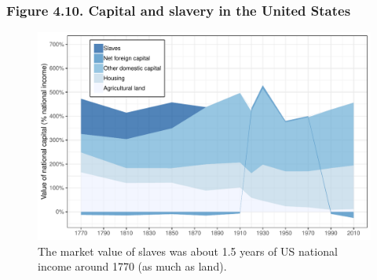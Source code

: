 \documentclass[t]{beamer}\usepackage[]{graphicx}\usepackage[]{color}
\newenvironment{knitrout}{}{} %
\begin{document}
\begin{frame}[label=Figure_4_10]
\frametitle{Figure 4.10. Capital and slavery in the United States}
\begin{figure}[t]
\begin{minipage}[b]{\textwidth}
\centering
\begin{knitrout}\footnotesize
{}\color{fgcolor}

{\centering \includegraphics[width=1\linewidth]{figures/color/Figure_4_10} 

}



\end{knitrout}
\caption{The market value of slaves was about 1.5 years of US national income around 1770 (as much as land).}
\end{minipage}
\end{figure}
\end{frame}
\end{document}
